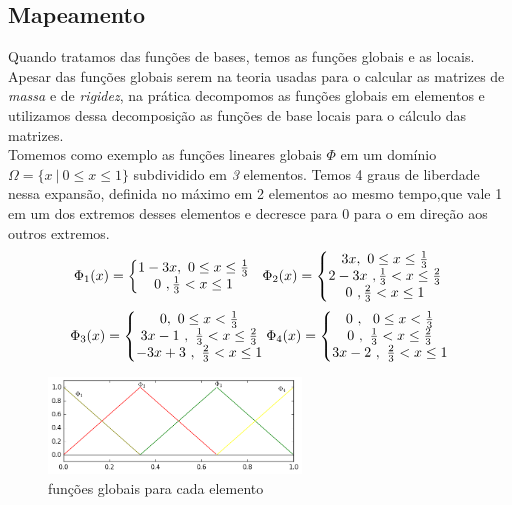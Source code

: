 
 
\subsection{Mapeamento}
 Quando tratamos das funções de bases, temos as funções globais e as locais. Apesar das funções globais serem na teoria usadas para o calcular as matrizes de \emph{massa} e de \emph{rigidez}, na prática decompomos as funções globais em elementos e utilizamos dessa decomposição as funções de base locais para o cálculo das matrizes.\\
 Tomemos como exemplo as funções lineares globais $\Phi$ em um domínio $\Omega = \{x\ |\ 0\leq x \leq 1\}$ subdividido em \emph{3} elementos. Temos 4 graus de liberdade nessa expansão, definida no máximo em 2 elementos ao mesmo tempo,que vale 1 em um dos extremos desses elementos e decresce para 0 para o em direção aos outros extremos.
\begin{equation}
\Phi_1(x) = \left\{\begin{matrix}
1 - 3x,\ 0 \leq x \leq \frac{1}{3}\\
0\ , \frac{1}{3} < x \leq 1
\end{matrix}\right.\ \ 
\Phi_2(x) = \left\{\begin{matrix}
3x,\ 0 \leq x \leq \frac{1}{3}\\
2 - 3x\ , \frac{1}{3} < x \leq \frac{2}{3}\\
0\ , \frac{2}{3} < x \leq 1
\end{matrix}\right.\\
\end{equation} 
\begin{equation}
\Phi_3(x) = \left\{\begin{matrix}
0 ,\ 0 \leq x < \frac{1}{3}\\
3x - 1\ ,\ \frac{1}{3} < x \leq \frac{2}{3}\\
-3x + 3 \ ,\ \frac{2}{3} < x \leq 1
\end{matrix}\right.\\
\Phi_4(x) = \left\{\begin{matrix}
0\ ,\ \ 0 \leq x < \frac{1}{3}\\
0\ ,\ \frac{1}{3} < x \leq \frac{2}{3}\\
3x -2 \ ,\ \frac{2}{3} < x \leq 1
\end{matrix}\right.
\end{equation}

\begin{figure}[!h]
\includegraphics[width=0.6\textwidth, center ]{figuras/Matrix_elem_global.png}
\caption{funções globais para cada elemento}
\end{figure}

